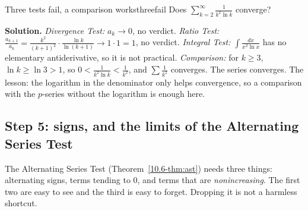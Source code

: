 \documentclass[11pt]{article}
\begin{document}
\begin{exmp}{Three tests fail, a comparison works}{threefail}
Does $\displaystyle\sum_{k=2}^\infty\frac1{k^2\ln k}$ converge?

\textbf{Solution.} \emph{Divergence Test:} $a_k\to0$, no verdict. \emph{Ratio Test:} $\frac{a_{k+1}}{a_k}=\frac{k^2}{(k+1)^2}\cdot\frac{\ln k}{\ln(k+1)}\to1\cdot1=1$, no verdict. \emph{Integral Test:} $\int\frac{dx}{x^2\ln x}$ has no elementary antiderivative, so it is not practical. \emph{Comparison:} for $k\ge3$, $\ln k\ge\ln3>1$, so $0<\frac1{k^2\ln k}<\frac1{k^2}$, and $\sum\frac1{k^2}$ converges. The series converges. The lesson: the logarithm in the denominator only helps convergence, so a comparison with the $p$-series without the logarithm is enough here.
\end{exmp}

\subsection*{Step 5: signs, and the limits of the Alternating Series Test}

The Alternating Series Test (Theorem~\ref{10.6-thm:ast}) needs three things: alternating signs, terms tending to $0$, and terms that are \emph{nonincreasing}. The first two are easy to see and the third is easy to forget. Dropping it is not a harmless shortcut.
\end{document}
